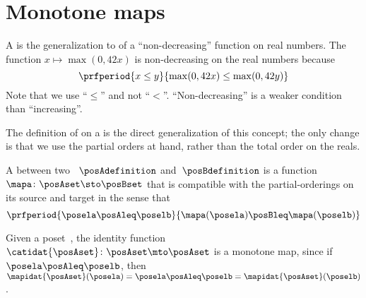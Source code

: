 
\section{Monotone maps}
\label{sec:monotonicity-monotone-maps}


A  is the generalization to  of a ``non-decreasing'' function on real numbers.
The function $x \mapsto \max(0, 42 x)$ is non-decreasing on the real numbers because
\begin{equation}\label{eq:monotone-eq-1}
    \prfperiod{
        x \leq y
    }{
        \max(0, 42 x) \leq \max(0, 42 y)
    }
\end{equation}
Note that we use ``$\leq$'' and not ``$<$''.
``Non-decreasing'' is a weaker condition than ``increasing''.

The definition of  on a  is the direct generalization of this concept; the only change is that we use the partial orders at hand, rather than the total order on the reals.

\begin{definition}
    \label{def:monotone}
    A  between two ~$\posAdefinition$ and~$\posBdefinition$ is a function~$\mapa \colon \posAset \sto \posBset$ that is compatible with the partial-orderings on its source and target in the sense that
    \begin{equation}\label{eq:monotone-map-definition}
        \prfperiod{
            \posela \posAleq \poselb
        }{
            \mapa(\posela) \posBleq \mapa(\poselb)
        }
    \end{equation}
\end{definition}

\begin{example}
    Given a poset~\posA, the identity function $\catidat{\posAset}\colon \posAset \mto\linebreak[0] \posAset$ is a monotone map, since if~$\posela\posAleq \poselb$, then~$\mapidat{\posAset}(\posela)=\posela \posAleq \poselb = \mapidat{\posAset}(\poselb )$.
\end{example}

